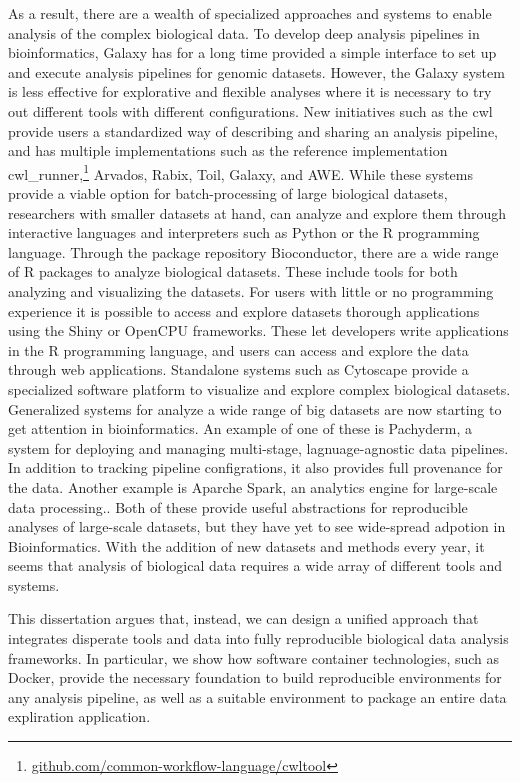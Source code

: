 As a result, there are a wealth of specialized approaches and systems to enable
analysis of the complex biological data. To develop deep analysis pipelines in
bioinformatics, Galaxy\cite{galaxy} has for a long time provided a simple
interface to set up and execute analysis pipelines for genomic datasets.
However, the Galaxy system is less effective for explorative and flexible
analyses where it is necessary to try out different tools with different
configurations.\cite{spjuth2015experiences} New initiatives such as the
\gls{cwl} provide users a standardized way of describing and sharing an analysis
pipeline, and has multiple implementations such as the reference implementation
cwl\_runner,\footnote{\url{github.com/common-workflow-language/cwltool}}
Arvados,\cite{arvados} Rabix,\cite{rabix} Toil,\cite{toil} Galaxy,\cite{galaxy}
and AWE.\cite{awe}
While these systems provide a viable option for batch-processing of
large biological datasets, researchers with smaller datasets at hand, can
analyze and explore them through interactive languages and interpreters such as
Python or the  R programming language.  Through the package repository
Bioconductor, there are a wide range of R packages to analyze biological
datasets. These include tools for both analyzing and visualizing the datasets.
For users with little or no programming experience it is possible to access and
explore datasets thorough applications using the Shiny or OpenCPU frameworks.
These let developers write applications in the R programming language, and users
can access and explore the data through web applications. Standalone systems
such as Cytoscape provide a specialized software platform to visualize and
explore complex biological datasets.\cite{cytoscape} 
Generalized systems for analyze a wide range of big datasets are now starting to
get attention in bioinformatics. An example of one of these is Pachyderm, a
system for deploying and managing multi-stage, lagnuage-agnostic data
pipelines.\cite{pachyderm} In addition to tracking pipeline configrations,
it also provides full provenance for the data.
Another example is Aparche Spark, an analytics engine for large-scale data
processing.\cite{spark}. Both of these provide useful abstractions for
reproducible analyses of large-scale datasets, but they have yet to see
wide-spread adpotion in Bioinformatics.  
With the addition of new datasets and methods every year, it seems that analysis
of biological data requires a wide array of different tools and systems.

This dissertation argues that, instead, we can design a unified approach that
integrates disperate 
tools and data into fully reproducible biological data
analysis frameworks.  
In particular, we show how software container
technologies, 
such as Docker, provide the necessary foundation to build
reproducible environments for any analysis pipeline, as well as a suitable
environment to package an entire data expliration application. 

